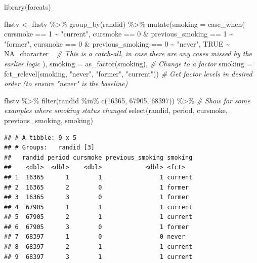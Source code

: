 \documentclass[
]{book}
\newenvironment{Shaded}{\begin{snugshade}}{\end{snugshade}}
\newcommand{\AttributeTok}[1]{\textcolor[rgb]{0.77,0.63,0.00}{#1}}
\newcommand{\CommentTok}[1]{\textcolor[rgb]{0.56,0.35,0.01}{\textit{#1}}}
\newcommand{\ConstantTok}[1]{\textcolor[rgb]{0.00,0.00,0.00}{#1}}
\newcommand{\DecValTok}[1]{\textcolor[rgb]{0.00,0.00,0.81}{#1}}
\newcommand{\FunctionTok}[1]{\textcolor[rgb]{0.00,0.00,0.00}{#1}}
\newcommand{\NormalTok}[1]{#1}
\newcommand{\OtherTok}[1]{\textcolor[rgb]{0.56,0.35,0.01}{#1}}
\newcommand{\SpecialCharTok}[1]{\textcolor[rgb]{0.00,0.00,0.00}{#1}}
\newcommand{\StringTok}[1]{\textcolor[rgb]{0.31,0.60,0.02}{#1}}
\begin{document}
\begin{Shaded}
\begin{Highlighting}[]
\FunctionTok{library}\NormalTok{(forcats)}

\NormalTok{fhstv }\OtherTok{\textless{}{-}}\NormalTok{ fhstv }\SpecialCharTok{\%\textgreater{}\%} 
  \FunctionTok{group\_by}\NormalTok{(randid) }\SpecialCharTok{\%\textgreater{}\%} 
  \FunctionTok{mutate}\NormalTok{(}\AttributeTok{smoking =} \FunctionTok{case\_when}\NormalTok{(}
\NormalTok{    cursmoke }\SpecialCharTok{==} \DecValTok{1} \SpecialCharTok{\textasciitilde{}} \StringTok{"current"}\NormalTok{, }
\NormalTok{    cursmoke }\SpecialCharTok{==} \DecValTok{0} \SpecialCharTok{\&}\NormalTok{ previous\_smoking }\SpecialCharTok{==} \DecValTok{1} \SpecialCharTok{\textasciitilde{}} \StringTok{"former"}\NormalTok{,}
\NormalTok{    cursmoke }\SpecialCharTok{==} \DecValTok{0} \SpecialCharTok{\&}\NormalTok{ previous\_smoking }\SpecialCharTok{==} \DecValTok{0} \SpecialCharTok{\textasciitilde{}} \StringTok{"never"}\NormalTok{, }
    \ConstantTok{TRUE} \SpecialCharTok{\textasciitilde{}} \ConstantTok{NA\_character\_} \CommentTok{\# This is a catch{-}all, in case there are any cases missed by the earlier logic}
\NormalTok{                             ),}
    \AttributeTok{smoking =} \FunctionTok{as\_factor}\NormalTok{(smoking),  }\CommentTok{\# Change to a factor}
    \AttributeTok{smoking =} \FunctionTok{fct\_relevel}\NormalTok{(smoking, }\StringTok{"never"}\NormalTok{, }\StringTok{"former"}\NormalTok{, }\StringTok{"current"}\NormalTok{)) }\CommentTok{\# Get factor levels in desired order (to ensure "never" is the baseline)}

\NormalTok{fhstv }\SpecialCharTok{\%\textgreater{}\%} 
  \FunctionTok{filter}\NormalTok{(randid }\SpecialCharTok{\%in\%} \FunctionTok{c}\NormalTok{(}\DecValTok{16365}\NormalTok{, }\DecValTok{67905}\NormalTok{, }\DecValTok{68397}\NormalTok{)) }\SpecialCharTok{\%\textgreater{}\%} \CommentTok{\# Show for some examples where smoking status changed}
  \FunctionTok{select}\NormalTok{(randid, period, cursmoke, previous\_smoking, smoking)}
\end{Highlighting}
\end{Shaded}

\begin{verbatim}
## # A tibble: 9 x 5
## # Groups:   randid [3]
##   randid period cursmoke previous_smoking smoking
##    <dbl>  <dbl>    <dbl>            <dbl> <fct>  
## 1  16365      1        1                1 current
## 2  16365      2        0                1 former 
## 3  16365      3        0                1 former 
## 4  67905      1        1                1 current
## 5  67905      2        1                1 current
## 6  67905      3        0                1 former 
## 7  68397      1        0                0 never  
## 8  68397      2        1                1 current
## 9  68397      3        1                1 current
\end{verbatim}
\end{document}
